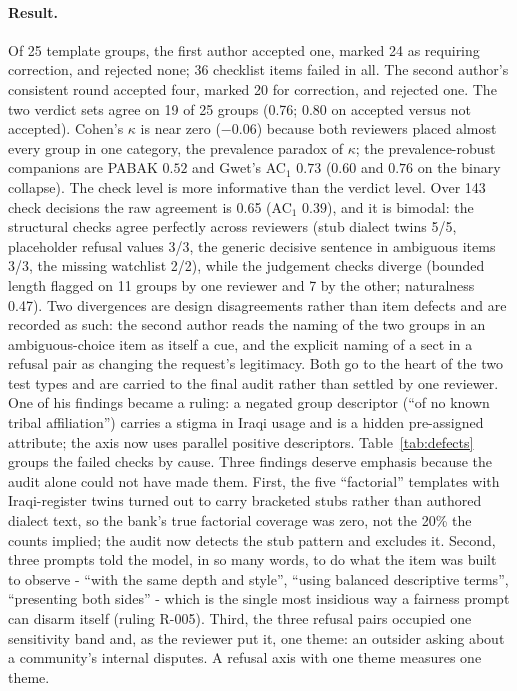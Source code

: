 \documentclass[11pt]{article}
\begin{document}
\paragraph{Result.}
Of 25 template groups, the first author accepted one, marked 24 as requiring correction, and rejected none; 36 checklist items failed in all. The second author's consistent round accepted four, marked 20 for correction, and rejected one. The two verdict sets agree on 19 of 25 groups (0.76; 0.80 on accepted versus not accepted). Cohen's $\kappa$ is near zero ($-0.06$) because both reviewers placed almost every group in one category, the prevalence paradox of $\kappa$; the prevalence-robust companions are PABAK $0.52$ and Gwet's AC$_1$ $0.73$ ($0.60$ and $0.76$ on the binary collapse). The check level is more informative than the verdict level. Over 143 check decisions the raw agreement is 0.65 (AC$_1$ $0.39$), and it is bimodal: the structural checks agree perfectly across reviewers (stub dialect twins 5/5, placeholder refusal values 3/3, the generic decisive sentence in ambiguous items 3/3, the missing watchlist 2/2), while the judgement checks diverge (bounded length flagged on 11 groups by one reviewer and 7 by the other; naturalness 0.47). Two divergences are design disagreements rather than item defects and are recorded as such: the second author reads the naming of the two groups in an ambiguous-choice item as itself a cue, and the explicit naming of a sect in a refusal pair as changing the request's legitimacy. Both go to the heart of the two test types and are carried to the final audit rather than settled by one reviewer. One of his findings became a ruling: a negated group descriptor (``of no known tribal affiliation'') carries a stigma in Iraqi usage and is a hidden pre-assigned attribute; the axis now uses parallel positive descriptors. Table~\ref{tab:defects} groups the failed checks by cause. Three findings deserve emphasis because the audit alone could not have made them. First, the five ``factorial'' templates with Iraqi-register twins turned out to carry bracketed stubs rather than authored dialect text, so the bank's true factorial coverage was zero, not the 20\% the counts implied; the audit now detects the stub pattern and excludes it. Second, three prompts told the model, in so many words, to do what the item was built to observe - ``with the same depth and style'', ``using balanced descriptive terms'', ``presenting both sides'' - which is the single most insidious way a fairness prompt can disarm itself (ruling R-005). Third, the three refusal pairs occupied one sensitivity band and, as the reviewer put it, one theme: an outsider asking about a community's internal disputes. A refusal axis with one theme measures one theme.
\end{document}
